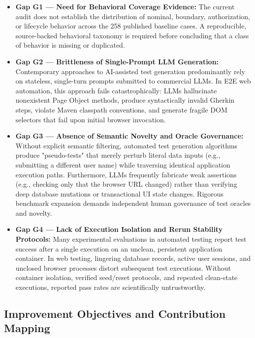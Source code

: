 \documentclass[pdflatex,sn-mathphys-num]{sn-jnl}
\begin{document}
\begin{itemize}
    \item \textbf{Gap G1 --- Need for Behavioral Coverage Evidence:} The current audit does not establish the distribution of nominal, boundary, authorization, or lifecycle behavior across the 258 published baseline cases. A reproducible, source-backed behavioral taxonomy is required before concluding that a class of behavior is missing or duplicated.
    \item \textbf{Gap G2 --- Brittleness of Single-Prompt LLM Generation:} Contemporary approaches to AI-assisted test generation predominantly rely on stateless, single-turn prompts submitted to commercial LLMs. In E2E web automation, this approach fails catastrophically: LLMs hallucinate nonexistent Page Object methods, produce syntactically invalid Gherkin steps, violate Maven classpath conventions, and generate fragile DOM selectors that fail upon initial browser invocation.
    \item \textbf{Gap G3 --- Absence of Semantic Novelty and Oracle Governance:} Without explicit semantic filtering, automated test generation algorithms produce "pseudo-tests" that merely perturb literal data inputs (e.g., submitting a different user name) while traversing identical application execution paths. Furthermore, LLMs frequently fabricate weak assertions (e.g., checking only that the browser URL changed) rather than verifying deep database mutations or transactional UI state changes. Rigorous benchmark expansion demands independent human governance of test oracles and novelty.
    \item \textbf{Gap G4 --- Lack of Execution Isolation and Rerun Stability Protocols:} Many experimental evaluations in automated testing report test success after a single execution on an unclean, persistent application container. In web testing, lingering database records, active user sessions, and unclosed browser processes distort subsequent test executions. Without container isolation, verified seed/reset protocols, and repeated clean-state executions, reported pass rates are scientifically untrustworthy.
\end{itemize}

\subsection{Improvement Objectives and Contribution Mapping}
\end{document}
